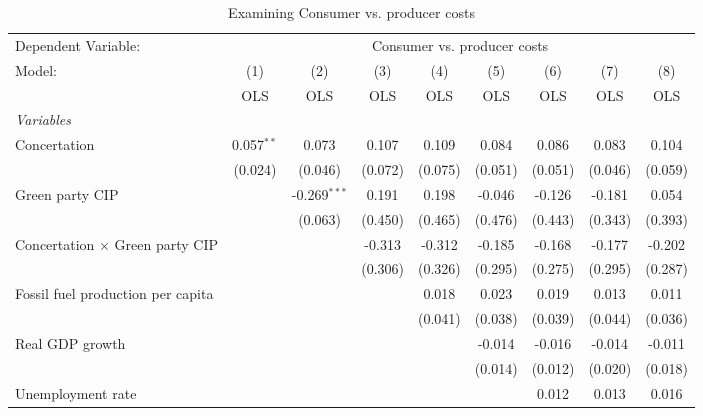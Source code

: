 
\begin{table}[htbp]
   \caption{Examining Consumer vs. producer costs}
   \centering
   \begin{tabular}{lcccccccc}
      \toprule
      Dependent Variable: & \multicolumn{8}{c}{Consumer vs. producer costs}\\
      Model:                                  & (1)          & (2)            & (3)     & (4)     & (5)     & (6)     & (7)     & (8)\\  
                                              &  OLS         & OLS            & OLS     & OLS     & OLS     & OLS     & OLS     & OLS\\  
      \midrule
      \emph{Variables}\\
      Concertation                            & 0.057$^{**}$ & 0.073          & 0.107   & 0.109   & 0.084   & 0.086   & 0.083   & 0.104\\   
                                              & (0.024)      & (0.046)        & (0.072) & (0.075) & (0.051) & (0.051) & (0.046) & (0.059)\\   
      Green party CIP                         &              & -0.269$^{***}$ & 0.191   & 0.198   & -0.046  & -0.126  & -0.181  & 0.054\\   
                                              &              & (0.063)        & (0.450) & (0.465) & (0.476) & (0.443) & (0.343) & (0.393)\\   
      Concertation $\times$ Green party CIP   &              &                & -0.313  & -0.312  & -0.185  & -0.168  & -0.177  & -0.202\\   
                                              &              &                & (0.306) & (0.326) & (0.295) & (0.275) & (0.295) & (0.287)\\   
      Fossil fuel production per capita       &              &                &         & 0.018   & 0.023   & 0.019   & 0.013   & 0.011\\   
                                              &              &                &         & (0.041) & (0.038) & (0.039) & (0.044) & (0.036)\\   
      Real GDP growth                         &              &                &         &         & -0.014  & -0.016  & -0.014  & -0.011\\   
                                              &              &                &         &         & (0.014) & (0.012) & (0.020) & (0.018)\\   
      Unemployment rate                       &              &                &         &         &         & 0.012   & 0.013   & 0.016\\   

\end{tabular}
\end{table}
